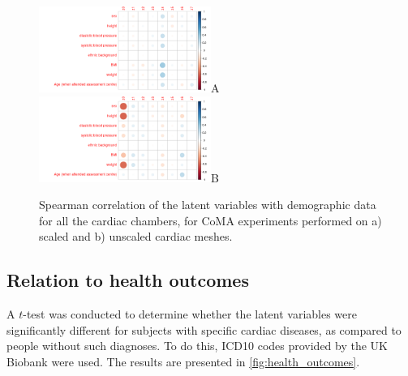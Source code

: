 \begin{figure}[ht!]
\includegraphics[width=0.5\textwidth]{figs/correlation/experiment_1_vs_demographic_data}A
\includegraphics[width=0.5\textwidth]{figs/correlation/experiment_2_vs_demographic_data}B
\caption{Spearman correlation of the latent variables with demographic data for all the cardiac chambers, for CoMA experiments performed on a) scaled and b) unscaled cardiac meshes.}
\label{fig:relation_to_demographic}
\end{figure}

\subsection*{Relation to health outcomes}
A $t$-test was conducted to determine whether the latent variables were significantly different for subjects with specific cardiac diseases, as compared to people without such diagnoses. To do this, ICD10 codes provided by the UK Biobank were used. The results are presented in \ref{fig:health_outcomes}.



